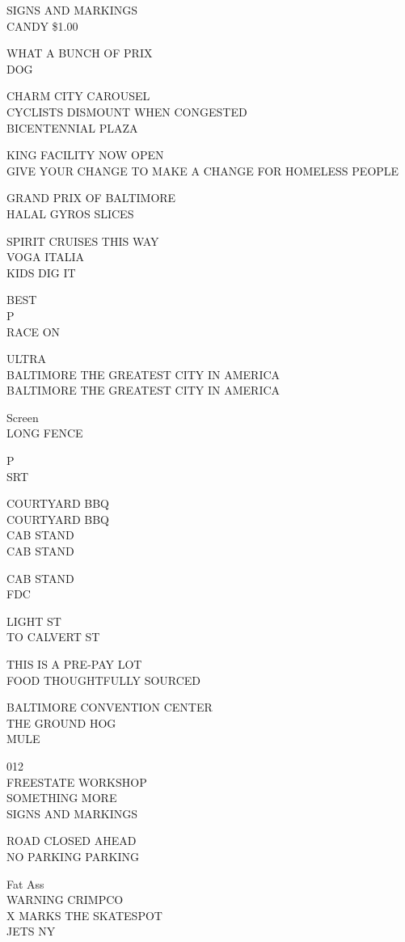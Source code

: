\documentclass[10pt,letterpaper]{article}
\begin{document}
SIGNS AND MARKINGS\\
CANDY \$1.00

WHAT A BUNCH OF PRIX\\
DOG

CHARM CITY CAROUSEL\\
CYCLISTS DISMOUNT WHEN CONGESTED\\
BICENTENNIAL PLAZA

KING FACILITY NOW OPEN\\
GIVE YOUR CHANGE TO MAKE A CHANGE FOR HOMELESS PEOPLE

GRAND PRIX OF BALTIMORE\\
HALAL GYROS SLICES

SPIRIT CRUISES THIS WAY\\
VOGA ITALIA\\
KIDS DIG IT

BEST\\
P\\
RACE ON

ULTRA\\
BALTIMORE THE GREATEST CITY IN AMERICA\\
BALTIMORE THE GREATEST CITY IN AMERICA

Screen\\
LONG FENCE

P\\
SRT

COURTYARD BBQ\\
COURTYARD BBQ\\
CAB STAND\\
CAB STAND

CAB STAND\\
FDC

LIGHT ST\\
TO CALVERT ST

THIS IS A PRE{-}PAY LOT\\
FOOD THOUGHTFULLY SOURCED

BALTIMORE CONVENTION CENTER\\
THE GROUND HOG\\
MULE

012\\
FREESTATE WORKSHOP\\
SOMETHING MORE\\
SIGNS AND MARKINGS

ROAD CLOSED AHEAD\\
NO PARKING PARKING

Fat Ass\\
WARNING CRIMPCO\\
X MARKS THE SKATESPOT\\
JETS NY
\end{document}
